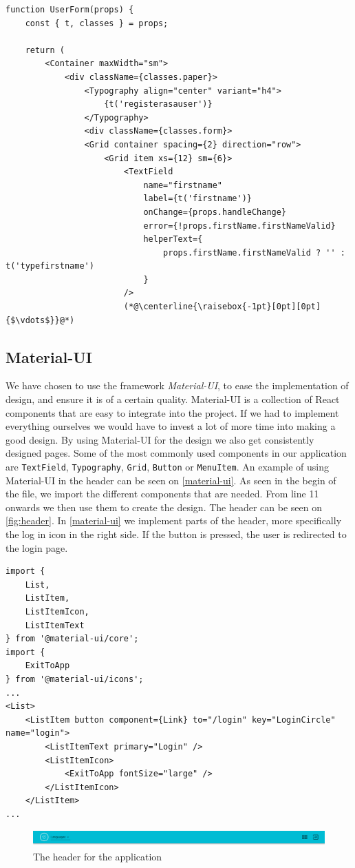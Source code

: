 \begin{lstlisting}[caption={Presentational component for userform}, captionpos=b, label={user-form}]
function UserForm(props) {
    const { t, classes } = props;
    
    return (
        <Container maxWidth="sm">
            <div className={classes.paper}>
                <Typography align="center" variant="h4">
                    {t('registerasauser')}
                </Typography>
                <div className={classes.form}>
                <Grid container spacing={2} direction="row">
                    <Grid item xs={12} sm={6}>
                        <TextField
                            name="firstname"
                            label={t('firstname')}
                            onChange={props.handleChange}
                            error={!props.firstName.firstNameValid}
                            helperText={
                                props.firstName.firstNameValid ? '' : t('typefirstname')
                            }
                        />
                        (*@\centerline{\raisebox{-1pt}[0pt][0pt]{$\vdots$}}@*)
\end{lstlisting}

\subsection{Material-UI}
We have chosen to use the framework \textit{Material-UI}, to ease the implementation of design, and ensure it is of a certain quality.
Material-UI is a collection of React components that are easy to integrate into the project.
If we had to implement everything ourselves we would have to invest a lot of more time into making a good design.
By using Material-UI for the design we also get consistently designed pages.
Some of the most commonly used components in our application are \texttt{TextField}, \texttt{Typography}, \texttt{Grid}, \texttt{Button} or \texttt{MenuItem}.
An example of using Material-UI in the header can be seen on \autoref{material-ui}.
As seen in the begin of the file, we import the different components that are needed.
From line 11 onwards we then use them to create the design.
The header can be seen on \autoref{fig:header}.
In \autoref{material-ui} we implement parts of the header, more specifically the log in icon in the right side.
If the button is pressed, the user is redirected to the login page.
\begin{lstlisting}[caption={Use of material-ui in the header}, captionpos=b, label={material-ui}]
import {
    List,
    ListItem,
    ListItemIcon,
    ListItemText
} from '@material-ui/core';
import {
	ExitToApp
} from '@material-ui/icons';
...
<List>
    <ListItem button component={Link} to="/login" key="LoginCircle" name="login">
        <ListItemText primary="Login" />
        <ListItemIcon>
            <ExitToApp fontSize="large" />
        </ListItemIcon>
    </ListItem>
...
\end{lstlisting}


\begin{figure}[H]
    \includegraphics[width=\linewidth]{figures/header.png}
    \caption{The header for the application}
    \label{fig:header}
\end{figure}
  
